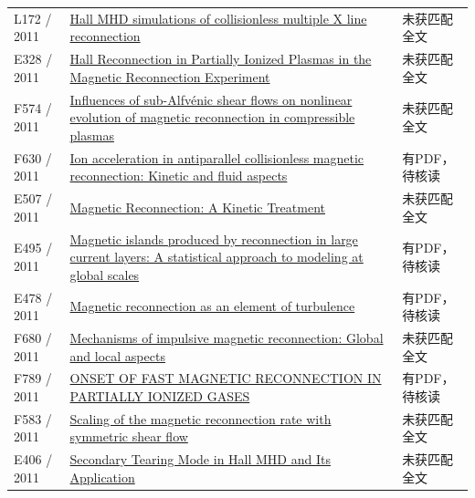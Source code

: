 \documentclass[UTF8,a4paper,11pt,openany,fontset=fandol]{ctexbook}
\begin{document}
\begin{longtable}{P{24mm}P{97mm}P{27mm}}
L172 / 2011 & \href{https://doi.org/10.1029/2010ja015992}{Hall MHD simulations of collisionless multiple X line reconnection} & 未获匹配全文\\

E328 / 2011 & \href{http://ui.adsabs.harvard.edu/abs/2012decs.confE...2L/abstract}{Hall Reconnection in Partially Ionized Plasmas in the Magnetic Reconnection Experiment} & 未获匹配全文\\

F574 / 2011 & \href{https://doi.org/10.1063/1.3643792}{Influences of sub-Alfvénic shear flows on nonlinear evolution of magnetic reconnection in compressible plasmas} & 未获匹配全文\\

F630 / 2011 & \href{https://doi.org/10.1016/j.crhy.2010.11.004}{Ion acceleration in antiparallel collisionless magnetic reconnection: Kinetic and fluid aspects} & 有PDF，待核读\\

E507 / 2011 & \href{https://doi.org/10.1029/gm090p0155}{Magnetic Reconnection: A Kinetic Treatment} & 未获匹配全文\\

E495 / 2011 & \href{http://hdl.handle.net/1903/12005}{Magnetic islands produced by reconnection in large current layers: A statistical approach to modeling at global scales} & 有PDF，待核读\\

E478 / 2011 & \href{https://doi.org/10.5194/npg-18-675-2011}{Magnetic reconnection as an element of turbulence} & 有PDF，待核读\\

F680 / 2011 & \href{https://doi.org/10.1063/1.3658034}{Mechanisms of impulsive magnetic reconnection: Global and local aspects} & 未获匹配全文\\

F789 / 2011 & \href{https://doi.org/10.1088/0004-637x/739/2/72}{ONSET OF FAST MAGNETIC RECONNECTION IN PARTIALLY IONIZED GASES} & 有PDF，待核读\\

F583 / 2011 & \href{https://doi.org/10.1063/1.3609771}{Scaling of the magnetic reconnection rate with symmetric shear flow} & 未获匹配全文\\

E406 / 2011 & \href{http://ui.adsabs.harvard.edu/abs/2011AGUFMSM23B2046M/abstract}{Secondary Tearing Mode in Hall MHD and Its Application} & 未获匹配全文\\


\end{longtable}
\end{document}
